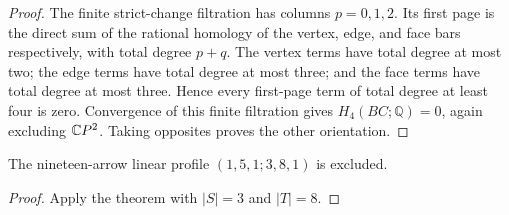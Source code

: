 \begin{proof}
The finite strict-change filtration has columns $p=0,1,2$.
Its first page is the direct sum of the rational homology of
the vertex, edge, and face bars respectively, with total
degree $p+q$. The vertex terms have total degree at most two;
the edge terms have total degree at most three; and the face
terms have total degree at most three. Hence every first-page
term of total degree at least four is zero. Convergence of
this finite filtration gives $H_4(BC;\mathbb Q)=0$, again
excluding $\mathbb{C}P^2$. Taking opposites proves the other orientation.
\end{proof}

\begin{corollary}
\label{CP2:A-nineteen-five-middle-eight-stalk}
The nineteen-arrow linear profile $(1,5,1;3,8,1)$ is excluded.
\end{corollary}
\begin{proof}
Apply the theorem with $|S|=3$ and $|T|=8$.
\end{proof}
